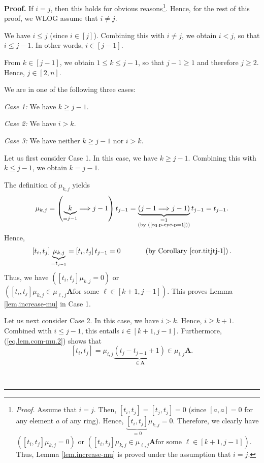 \documentclass[numbers=enddot,12pt,final,onecolumn,notitlepage]{scrartcl}%
\theoremstyle{definition}
\newenvironment{proof}[1][Proof]{\noindent\textbf{#1.} }{\ \rule{0.5em}{0.5em}}
\begin{document}
\begin{proof}
If $i=j$, then this holds for obvious reasons\footnote{\textit{Proof.} Assume
that $i=j$. Then, $\left[  t_{i},t_{j}\right]  =\left[  t_{j},t_{j}\right]
=0$ (since $\left[  a,a\right]  =0$ for any element $a$ of any ring). Hence,
$\underbrace{\left[  t_{i},t_{j}\right]  }_{=0}\mu_{k,j}=0$. Therefore, we
clearly have $\left(  \left[  t_{i},t_{j}\right]  \mu_{k,j}=0\right)  $ or
$\left(  \left[  t_{i},t_{j}\right]  \mu_{k,j}\in\mu_{\ell,j}\mathbf{A}\text{
for some }\ell\in\left[  k+1,j-1\right]  \right)  $. Thus, Lemma
\ref{lem.increase-mu} is proved under the assumption that $i=j$.}. Hence, for
the rest of this proof, we WLOG assume that $i\neq j$.

We have $i\leq j$ (since $i\in\left[  j\right]  $). Combining this with $i\neq
j$, we obtain $i<j$, so that $i\leq j-1$. In other words, $i\in\left[
j-1\right]  $.

From $k\in\left[  j-1\right]  $, we obtain $1\leq k\leq j-1$, so that
$j-1\geq1$ and therefore $j\geq2$. Hence, $j\in\left[  2,n\right]  $.

We are in one of the following three cases:

\textit{Case 1:} We have $k\geq j-1$.

\textit{Case 2:} We have $i>k$.

\textit{Case 3:} We have neither $k\geq j-1$ nor $i>k$.

Let us first consider Case 1. In this case, we have $k\geq j-1$. Combining
this with $k\leq j-1$, we obtain $k=j-1$.

The definition of $\mu_{k,j}$ yields
\[
\mu_{k,j}=\left(  \underbrace{k}_{=j-1}\Longrightarrow j-1\right)
t_{j-1}=\underbrace{\left(  j-1\Longrightarrow j-1\right)  }%
_{\substack{=1\\\text{(by (\ref{eq.p-cyc-p=1}))}}}t_{j-1}=t_{j-1}.
\]
Hence,
\[
\left[  t_{i},t_{j}\right]  \underbrace{\mu_{k,j}}_{=t_{j-1}}=\left[
t_{i},t_{j}\right]  t_{j-1}=0\ \ \ \ \ \ \ \ \ \ \left(  \text{by Corollary
\ref{cor.titjtj-1}}\right)  .
\]
Thus, we have $\left(  \left[  t_{i},t_{j}\right]  \mu_{k,j}=0\right)  $ or
$\left(  \left[  t_{i},t_{j}\right]  \mu_{k,j}\in\mu_{\ell,j}\mathbf{A}\text{
for some }\ell\in\left[  k+1,j-1\right]  \right)  $. This proves Lemma
\ref{lem.increase-mu} in Case 1.

Let us next consider Case 2. In this case, we have $i>k$. Hence, $i\geq k+1$.
Combined with $i\leq j-1$, this entails $i\in\left[  k+1,j-1\right]  $.
Furthermore, (\ref{eq.lem.com-mu.2}) shows that
\[
\left[  t_{i},t_{j}\right]  =\mu_{i,j}\underbrace{\left(  t_{j}-t_{j-1}%
+1\right)  }_{\in\mathbf{A}}\in\mu_{i,j}\mathbf{A}.
\]



\end{proof}
\end{document}

